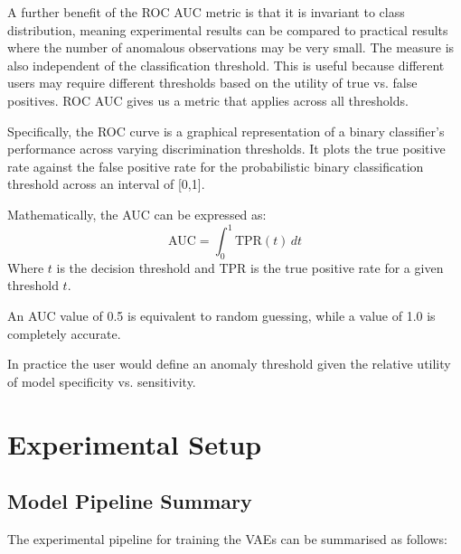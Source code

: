 \documentclass{mldsmsc}
\begin{document}
A further benefit of the ROC AUC metric is that it is invariant to class distribution, meaning experimental results can be compared to practical results where the number of anomalous observations may be very small. The measure is also independent of the classification threshold. This is useful because different users may require different thresholds based on the utility of true vs. false positives. ROC AUC gives us a metric that applies across all thresholds.

Specifically, the ROC curve is a graphical representation of a binary classifier's performance across varying discrimination thresholds. It plots the true positive rate against the false positive rate for the probabilistic binary classification threshold across an interval of [0,1].

Mathematically, the AUC can be expressed as:
\[
\text{AUC} = \int_{0}^{1} \text{TPR}(t) \, dt
\]
Where \( t \) is the decision threshold and TPR is the true positive rate  for a given threshold \( t \).

An AUC value of 0.5 is equivalent to random guessing, while a value of 1.0 is completely accurate.

In practice the user would define an anomaly threshold given the relative utility of model specificity vs. sensitivity. 

\chapter{Experimental Setup}

\section{Model Pipeline Summary}\label{sec:model_pipe}
The experimental pipeline for training the VAEs can be summarised as follows:
\end{document}
